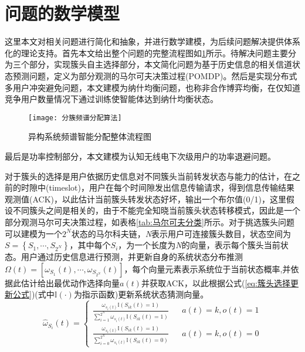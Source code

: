 \section{问题的数学模型}
这里本文对相关问题进行简化和抽象，并进行数学建模，为后续问题解决提供体系化的理论支持。首先本文给出整个问题的完整流程图如\ref{fig：整体流程图}所示。待解决问题主要分为三个部分，实现簇头自主选择部分，本文简化问题为基于历史信息的相关信道状态预测问题，定义为部分观测的马尔可夫决策过程(POMDP)。然后是实现分布式多用户冲突避免问题，本文建模为纳什均衡问题，也称非合作博弈均衡，在仅知道竞争用户数量情况下通过训练使智能体达到纳什均衡状态。
\begin{figure}[htbp]
	\centering
	\texttt{[image: 分簇频谱分配算法]}
	\caption{异构系统频谱智能分配整体流程图}
	\label{fig：整体流程图}
\end{figure}

最后是功率控制部分，本文建模为认知无线电下次级用户的功率退避问题。

对于簇头的选择是用户依据历史信息对不同簇头当前转发状态与能力的估计，在之前的时隙中(timeslot)，用户在每个时间隙发出信息传输请求，得到信息传输结果观测值(ACK)，以此估计当前簇头转发状态好坏，输出一个布尔值(0/1)，这里假设不同簇头之间是相关的，由于不能完全知晓当前簇头状态转移模式，因此是一个部分观测马尔可夫决策过程，如表格\ref{tab:马尔可夫分类}所示。对于挑选簇头问题可以建模为一个$2^{N}$状态的马尔科夫链，\textit{N}表示用户可连接簇头数目，状态空间为$S=\left\{S_{1},\cdots,S_{2^{N}}\right\}$，其中每个$S_{i}$，为一个长度为\textit{N}的向量，表示每个簇头当前状态。用户通过历史信息进行预测，并更新自身的系统状态分布推测$\Omega \left ( t \right )=\left [ \omega _{S_{1}} \left ( t \right ),\cdots,\omega _{S_{2^{N}}} \left ( t \right )\right ]$，每个向量元素表示系统位于当前状态概率,并依据此估计给出最优动作选择向量$a(t)$并获取ACK，以此根据公式(\ref{eq:簇头选择更新公式})(式中$\mathbb{I}\left(\cdot\right)$为指示函数)更新系统状态猜测向量\cite{8303773}。
\begin{equation}\label{eq:簇头选择更新公式}
\hat{\omega }_{S_{i}}\left ( t \right )=\left\{
\begin{aligned}
\frac{\omega _{s_{i}\left ( t \right )}\mathbb{I}\left ( S_{ik}\left ( t \right ) =1\right )}{\sum_{i=1}^{2^{N}}\omega _{s_{i}\left ( t \right )}\mathbb{I}\left ( S_{ik}\left ( t \right ) =1\right )}& & a(t)=k,o(t)=1\\
\frac{\omega _{s_{i}\left ( t \right )}\mathbb{I}\left ( S_{ik}\left ( t \right ) =1\right )}{\sum_{i=0}^{2^{N}}\omega _{s_{i}\left ( t \right )}\mathbb{I}\left ( S_{ik}\left ( t \right ) =0\right )}& & a(t)=k,o(t)=0
\end{aligned}
\right.
\end{equation}

